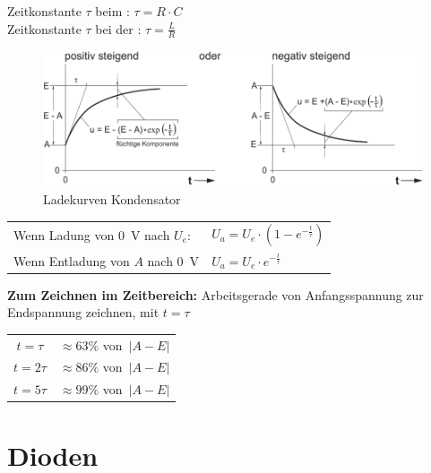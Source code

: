 \documentclass[a5paper, 12pt, twoside]{scrartcl}
\begin{document}
Zeitkonstante \(\tau\) beim : \dotfill \(\tau = R \cdot C\)\\
Zeitkonstante \(\tau\) bei der : \dotfill \(\tau = \frac{L}{R}\)\\

\begin{figure}[H]
  \centering
  \includegraphics[width=.7\textwidth]{LadekurveKondensator}
  \caption{Ladekurven Kondensator }
\end{figure}

\begin{center}
  \begin{tabular}{ll}
    \toprule
    Wenn Ladung von \SI{0}{\volt} nach \(U_e\): & \(U_a = U_e \cdot (1 - e^{-\frac{t}{\tau}})\)\\
    Wenn Entladung von \(A\) nach \SI{0}{\volt} & \(U_a = U_e \cdot e^{-\frac{t}{\tau}}\)\\
    \bottomrule
  \end{tabular}
\end{center}

\textbf{Zum Zeichnen im Zeitbereich:} Arbeitsgerade von Anfangsspannung zur Endspannung zeichnen, mit \(t = \tau\)


\begin{table}[H]
  \centering
  \begin{tabular}{cc}
    \toprule
    \(t=\tau\) & \(\approx 63\%\) von\ \(|A-E|\)\\
    \(t=2\tau\) & \(\approx 86\%\) von\ \(|A-E|\)\\
    \(t=5\tau\) & \(\approx 99\%\) von\ \(|A-E|\)\\
    \bottomrule
  \end{tabular}
\end{table}

\section{Dioden}
\end{document}
